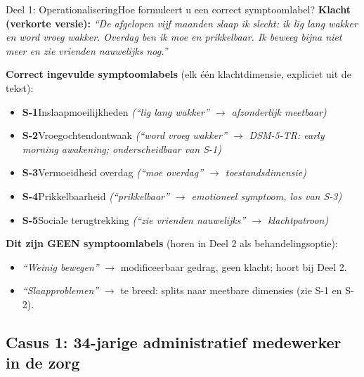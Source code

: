 \documentclass[11pt,a4paper]{article}
\begin{document}
\begin{voorbeeldbox}{Deel 1: Operationalisering}{Hoe formuleert u een correct symptoomlabel?}
\small
\textbf{Klacht (verkorte versie):} \textit{``De afgelopen vijf maanden slaap ik slecht:
ik lig lang wakker en word vroeg wakker. Overdag ben ik moe en prikkelbaar. Ik beweeg
bijna niet meer en zie vrienden nauwelijks nog.''}

\medskip
\textbf{Correct ingevulde symptoomlabels} (elk één klachtdimensie, expliciet uit de tekst):
\begin{itemize}[topsep=2pt,itemsep=1pt]
\item \textbf{S-1}\enspace Inslaapmoeilijkheden
  \hfill\textit{(``lig lang wakker'' $\rightarrow$ afzonderlijk meetbaar)}
\item \textbf{S-2}\enspace Vroegochtendontwaak
  \hfill\textit{(``word vroeg wakker'' $\rightarrow$ DSM-5-TR: early morning awakening; onderscheidbaar van S-1)}
\item \textbf{S-3}\enspace Vermoeidheid overdag
  \hfill\textit{(``moe overdag'' $\rightarrow$ toestandsdimensie)}
\item \textbf{S-4}\enspace Prikkelbaarheid
  \hfill\textit{(``prikkelbaar'' $\rightarrow$ emotioneel symptoom, los van S-3)}
\item \textbf{S-5}\enspace Sociale terugtrekking
  \hfill\textit{(``zie vrienden nauwelijks'' $\rightarrow$ klachtpatroon)}
\end{itemize}

\medskip
\textbf{\color{StrongRed}Dit zijn GEEN symptoomlabels} (horen in Deel 2 als behandelingsoptie):
\begin{itemize}[topsep=1pt,itemsep=0pt]
\item \textit{``Weinig bewegen''} $\rightarrow$ modificeerbaar gedrag, geen klacht; hoort bij Deel 2.
\item \textit{``Slaapproblemen''} $\rightarrow$ te breed: splits naar meetbare dimensies (zie S-1 en S-2).
\end{itemize}
\end{voorbeeldbox}

\vspace{0.5em}

\newpage

\subsection*{Casus 1: 34-jarige administratief medewerker in de zorg}
\end{document}
